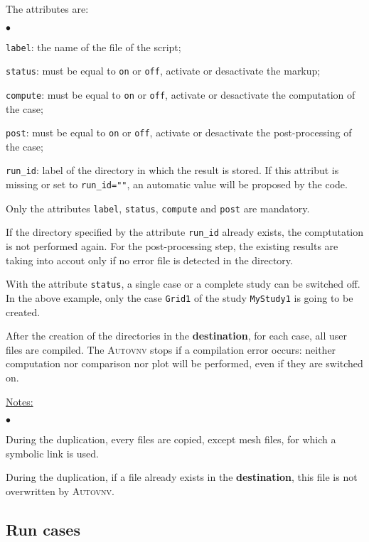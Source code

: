 \documentclass[a4paper,10pt,twoside]{csshortdoc}
\begin{document}
The attributes are:
\begin{list}{$\bullet$}{}
\item \texttt{label}: the name of the file of the script;
\item \texttt{status}: must be equal to \texttt{on} or \texttt{off},
activate or desactivate the markup;
\item \texttt{compute}: must be equal to \texttt{on} or \texttt{off},
activate or desactivate the computation of the case;
\item \texttt{post}: must be equal to \texttt{on} or \texttt{off},
activate or desactivate the post-processing of the case;
\item \texttt{run\_id}: label of the directory in which the result
is stored. If this attribut is missing or set to \texttt{run\_id=""}, an
automatic value will be proposed by the code.
\end{list}

Only the attributes \texttt{label}, \texttt{status}, \texttt{compute}
and \texttt{post} are mandatory.

If the directory specified by the attribute \texttt{run\_id} already exists,
the comptutation is not performed again. For the post-processing step, the existing
results are taking into accout only if no error file is detected in the
directory.

With the attribute \texttt{status}, a single case or a complete study can be
switched off. In the above example, only the case \texttt{Grid1} of the study
\texttt{MyStudy1} is going to be created.

After the creation of the directories in the \textbf{destination}, for each
case, all user files are compiled. The \textsc{Autovnv} stops if a compilation
error occurs: neither computation nor comparison nor plot will be performed,
even if they are switched on.

\underline{Notes:}

\begin{list}{$\bullet$}{}
\item During the duplication, every files are copied, except mesh files, for
which a symbolic link is used.
\item During the duplication, if a file already exists in the
\textbf{destination}, this file is not overwritten by \textsc{Autovnv}.
\end{list}


\subsection{Run cases}\label{sec:run}
\end{document}
